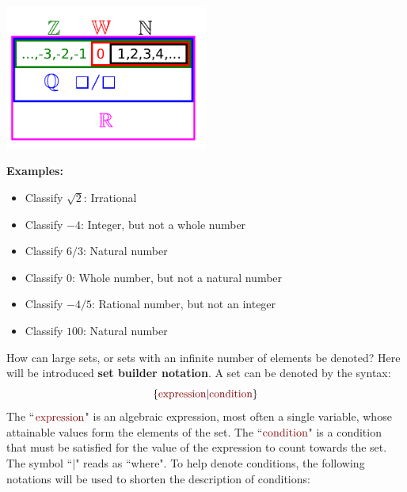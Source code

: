 \documentclass{article}
\newcommand{\dr}[1]{\textcolor{dark_red}{#1}}
\begin{document}
\includegraphics[width = 0.5\textwidth]{set_of_real_numbers}

\textbf{Examples:}

\begin{itemize}
\item Classify \(\sqrt{2}\): Irrational
\item Classify \(-4\): Integer, but not a whole number
\item Classify \(6/3\): Natural number
\item Classify \(0\): Whole number, but not a natural number
\item Classify \(-4/5\): Rational number, but not an integer
\item Classify \(100\): Natural number
\end{itemize}

How can large sets, or sets with an infinite number of elements be denoted? Here will be introduced {\bf set builder notation}. A set can be denoted by the syntax:
\[\{\dr{\text{expression}}|\dr{\text{condition}}\}\]
The ``\(\dr{\text{expression}}\)" is an algebraic expression, most often a single variable, whose attainable values form the elements of the set. The ``\(\dr{\text{condition}}\)" is a condition that must be satisfied for the value of the expression to count towards the set. The symbol ``\(|\)" reads as ``where".
To help denote conditions, the following notations will be used to shorten the description of conditions:
\end{document}

